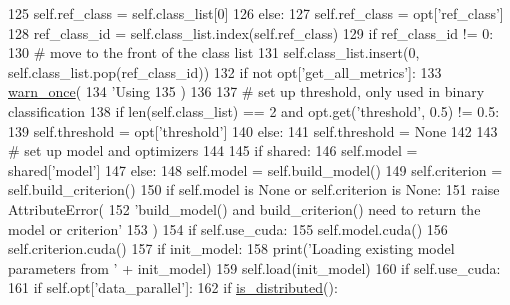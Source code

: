 \begin{DoxyCode}
125             self.ref\_class = self.class\_list[0]
126         \textcolor{keywordflow}{else}:
127             self.ref\_class = opt[\textcolor{stringliteral}{'ref\_class'}]
128             ref\_class\_id = self.class\_list.index(self.ref\_class)
129             \textcolor{keywordflow}{if} ref\_class\_id != 0:
130                 \textcolor{comment}{# move to the front of the class list}
131                 self.class\_list.insert(0, self.class\_list.pop(ref\_class\_id))
132         \textcolor{keywordflow}{if} \textcolor{keywordflow}{not} opt[\textcolor{stringliteral}{'get\_all\_metrics'}]:
133             \hyperlink{namespaceparlai_1_1utils_1_1misc_acf146e70ea7f6867969a7c2b545d4b4b}{warn\_once}(
134                 \textcolor{stringliteral}{'Using %
135             )
136 
137         \textcolor{comment}{# set up threshold, only used in binary classification}
138         \textcolor{keywordflow}{if} len(self.class\_list) == 2 \textcolor{keywordflow}{and} opt.get(\textcolor{stringliteral}{'threshold'}, 0.5) != 0.5:
139             self.threshold = opt[\textcolor{stringliteral}{'threshold'}]
140         \textcolor{keywordflow}{else}:
141             self.threshold = \textcolor{keywordtype}{None}
142 
143         \textcolor{comment}{# set up model and optimizers}
144 
145         \textcolor{keywordflow}{if} shared:
146             self.model = shared[\textcolor{stringliteral}{'model'}]
147         \textcolor{keywordflow}{else}:
148             self.model = self.build\_model()
149             self.criterion = self.build\_criterion()
150             \textcolor{keywordflow}{if} self.model \textcolor{keywordflow}{is} \textcolor{keywordtype}{None} \textcolor{keywordflow}{or} self.criterion \textcolor{keywordflow}{is} \textcolor{keywordtype}{None}:
151                 \textcolor{keywordflow}{raise} AttributeError(
152                     \textcolor{stringliteral}{'build\_model() and build\_criterion() need to return the model or criterion'}
153                 )
154             \textcolor{keywordflow}{if} self.use\_cuda:
155                 self.model.cuda()
156                 self.criterion.cuda()
157             \textcolor{keywordflow}{if} init\_model:
158                 print(\textcolor{stringliteral}{'Loading existing model parameters from '} + init\_model)
159                 self.load(init\_model)
160             \textcolor{keywordflow}{if} self.use\_cuda:
161                 \textcolor{keywordflow}{if} self.opt[\textcolor{stringliteral}{'data\_parallel'}]:
162                     \textcolor{keywordflow}{if} \hyperlink{namespaceparlai_1_1utils_1_1distributed_a023acb5e3b66e1f27e21247c35661279}{is\_distributed}():
}
\end{DoxyCode}
